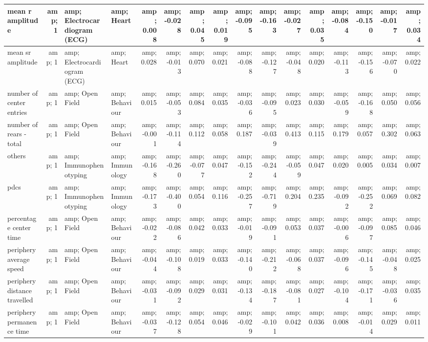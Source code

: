 \documentclass[]{article}
\begin{document}
\begin{table}
\begin{tabular}[t]{l|r|l|l|r|r|r|r|r|r|r|r|r|r|r|r}
\hline
mean r amplitude &amp; 1 &amp; Electrocardiogram (ECG) &amp; Heart &amp; 0.008 &amp; -0.028 &amp; 0.045 &amp; 0.019 &amp; -0.095 &amp; -0.163 &amp; -0.027 &amp; 0.035 &amp; -0.084 &amp; -0.150 &amp; -0.017 &amp; 0.034\\
\hline
mean sr amplitude &amp; 1 &amp; Electrocardiogram (ECG) &amp; Heart &amp; 0.028 &amp; -0.013 &amp; 0.070 &amp; 0.021 &amp; -0.088 &amp; -0.127 &amp; -0.048 &amp; 0.020 &amp; -0.113 &amp; -0.156 &amp; -0.070 &amp; 0.022\\
\hline
number of center entries &amp; 1 &amp; Open Field &amp; Behaviour &amp; 0.015 &amp; -0.053 &amp; 0.084 &amp; 0.035 &amp; -0.036 &amp; -0.095 &amp; 0.023 &amp; 0.030 &amp; -0.059 &amp; -0.168 &amp; 0.050 &amp; 0.056\\
\hline
number of rears - total &amp; 1 &amp; Open Field &amp; Behaviour &amp; -0.001 &amp; -0.114 &amp; 0.112 &amp; 0.058 &amp; 0.187 &amp; -0.039 &amp; 0.413 &amp; 0.115 &amp; 0.179 &amp; 0.057 &amp; 0.302 &amp; 0.063\\
\hline
others &amp; 1 &amp; Immunophenotyping &amp; Immunology &amp; -0.168 &amp; -0.260 &amp; -0.077 &amp; 0.047 &amp; -0.152 &amp; -0.244 &amp; -0.059 &amp; 0.047 &amp; 0.020 &amp; 0.005 &amp; 0.034 &amp; 0.007\\
\hline
pdcs &amp; 1 &amp; Immunophenotyping &amp; Immunology &amp; -0.173 &amp; -0.400 &amp; 0.054 &amp; 0.116 &amp; -0.257 &amp; -0.719 &amp; 0.204 &amp; 0.235 &amp; -0.092 &amp; -0.252 &amp; 0.069 &amp; 0.082\\
\hline
percentage center time &amp; 1 &amp; Open Field &amp; Behaviour &amp; -0.022 &amp; -0.086 &amp; 0.042 &amp; 0.033 &amp; -0.019 &amp; -0.091 &amp; 0.053 &amp; 0.037 &amp; -0.006 &amp; -0.097 &amp; 0.085 &amp; 0.046\\
\hline
periphery average speed &amp; 1 &amp; Open Field &amp; Behaviour &amp; -0.044 &amp; -0.108 &amp; 0.019 &amp; 0.033 &amp; -0.140 &amp; -0.212 &amp; -0.068 &amp; 0.037 &amp; -0.096 &amp; -0.145 &amp; -0.048 &amp; 0.025\\
\hline
periphery distance travelled &amp; 1 &amp; Open Field &amp; Behaviour &amp; -0.031 &amp; -0.092 &amp; 0.029 &amp; 0.031 &amp; -0.134 &amp; -0.187 &amp; -0.081 &amp; 0.027 &amp; -0.104 &amp; -0.171 &amp; -0.036 &amp; 0.035\\
\hline
periphery permanence time &amp; 1 &amp; Open Field &amp; Behaviour &amp; -0.037 &amp; -0.128 &amp; 0.054 &amp; 0.046 &amp; -0.029 &amp; -0.101 &amp; 0.042 &amp; 0.036 &amp; 0.008 &amp; -0.014 &amp; 0.029 &amp; 0.011\\

\end{tabular}
\end{table}
\end{document}
